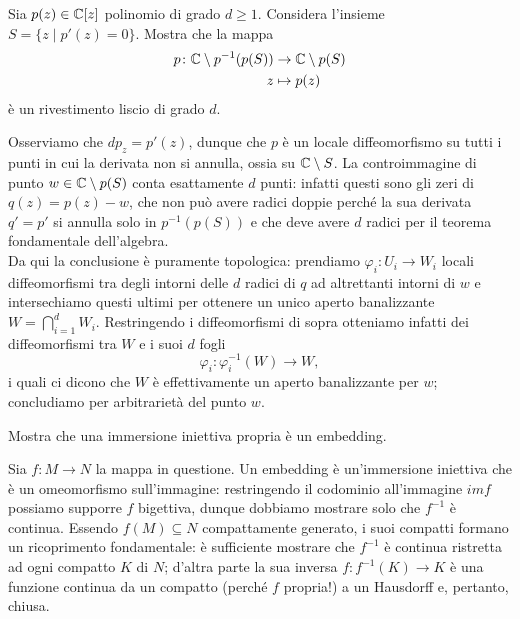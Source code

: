 \documentclass[a4paper]{article}
\begin{document}
\begin{ex}[1.4]{Sia $ p(z) \in \mathbb{C}[z] $ polinomio di grado $ d \geq 1 $. Considera l’insieme $ S = \{z \mid p'(z)=0\} $. Mostra che la mappa
		\begin{align*}
			p\colon  \mathbb{C} \setminus p^{-1}(p(S)) & \to \mathbb{C} \setminus p(S)\\
			z &\mapsto p(z)
		\end{align*}
		è un rivestimento liscio di grado $ d $.}
	
	Osserviamo che $ dp_z= p'(z) $, dunque che $ p $ è un locale diffeomorfismo su tutti i punti in cui la derivata non si annulla, ossia su $ \mathbb{C} \setminus S $. La controimmagine di punto $ w \in \mathbb{C} \setminus p(S) $ conta esattamente $ d $ punti: infatti questi sono gli zeri di $ q(z) = p(z)-w $, che non può avere radici doppie perché la sua derivata $ q' = p' $ si annulla solo in $ p^{-1}(p(S)) $ e che deve avere $ d $ radici per il teorema fondamentale dell'algebra. \\
	
	Da qui la conclusione è puramente topologica: prendiamo $ \varphi_i\colon U_i \to W_i $ locali diffeomorfismi tra degli intorni delle $ d $ radici di $ q $ ad altrettanti intorni di $ w $ e intersechiamo questi ultimi per ottenere un unico aperto banalizzante $ W = \bigcap_{i = 1}^d W_i $. Restringendo i diffeomorfismi di sopra otteniamo infatti dei diffeomorfismi tra $ W $ e i suoi $ d $ fogli $$  \varphi_i\colon \varphi_i^{-1}(W) \to W,  $$ i quali ci dicono che $ W $ è effettivamente un aperto banalizzante per $ w $; concludiamo per arbitrarietà del punto $ w $.
\end{ex}

\begin{ex}[2.1]{Mostra che una immersione iniettiva propria è un embedding.}
	
	Sia $ f\colon M \to N $ la mappa in questione. Un embedding è un'immersione iniettiva che è un omeomorfismo sull'immagine: restringendo il codominio all'immagine $ im f $ possiamo supporre $ f $ bigettiva, dunque dobbiamo mostrare solo che $ f^{-1} $ è continua. Essendo $ f(M) \subseteq N $ compattamente generato, i suoi compatti formano un ricoprimento fondamentale: è sufficiente mostrare che $ f^{-1} $ è continua ristretta ad ogni compatto $ K $ di $ N $; d'altra parte la sua inversa $ f\colon f^{-1}(K) \to K $ è una funzione continua da un compatto (perché $ f $ propria!) a un Hausdorff e, pertanto, chiusa.
\end{ex}
\end{document}
